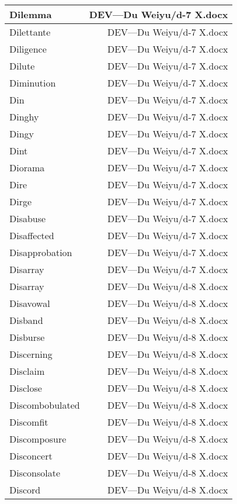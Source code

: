 \documentclass{article}
\begin{document}
\begin{center}
\begin{longtable}{|l|r|}
\hline
Dilemma  &  DEV---Du Weiyu/d-7 X.docx\\  
\hline
Dilettante  &  DEV---Du Weiyu/d-7 X.docx\\  
\hline
Diligence  &  DEV---Du Weiyu/d-7 X.docx\\  
\hline
Dilute  &  DEV---Du Weiyu/d-7 X.docx\\  
\hline
Diminution  &  DEV---Du Weiyu/d-7 X.docx\\  
\hline
Din  &  DEV---Du Weiyu/d-7 X.docx\\  
\hline
Dinghy  &  DEV---Du Weiyu/d-7 X.docx\\  
\hline
Dingy  &  DEV---Du Weiyu/d-7 X.docx\\  
\hline
Dint  &  DEV---Du Weiyu/d-7 X.docx\\  
\hline
Diorama  &  DEV---Du Weiyu/d-7 X.docx\\  
\hline
Dire  &  DEV---Du Weiyu/d-7 X.docx\\  
\hline
Dirge  &  DEV---Du Weiyu/d-7 X.docx\\  
\hline
Disabuse  &  DEV---Du Weiyu/d-7 X.docx\\  
\hline
Disaffected  &  DEV---Du Weiyu/d-7 X.docx\\  
\hline
Disapprobation  &  DEV---Du Weiyu/d-7 X.docx\\  
\hline
Disarray  &  DEV---Du Weiyu/d-7 X.docx\\  
\hline
Disarray  &  DEV---Du Weiyu/d-8 X.docx\\  
\hline
Disavowal  &  DEV---Du Weiyu/d-8 X.docx\\  
\hline
Disband  &  DEV---Du Weiyu/d-8 X.docx\\  
\hline
Disburse  &  DEV---Du Weiyu/d-8 X.docx\\  
\hline
Discerning  &  DEV---Du Weiyu/d-8 X.docx\\  
\hline
Disclaim  &  DEV---Du Weiyu/d-8 X.docx\\  
\hline
Disclose  &  DEV---Du Weiyu/d-8 X.docx\\  
\hline
Discombobulated  &  DEV---Du Weiyu/d-8 X.docx\\  
\hline
Discomfit  &  DEV---Du Weiyu/d-8 X.docx\\  
\hline
Discomposure  &  DEV---Du Weiyu/d-8 X.docx\\  
\hline
Disconcert  &  DEV---Du Weiyu/d-8 X.docx\\  
\hline
Disconsolate  &  DEV---Du Weiyu/d-8 X.docx\\  
\hline
Discord  &  DEV---Du Weiyu/d-8 X.docx\\  

\end{longtable}
\end{center}
\end{document}
